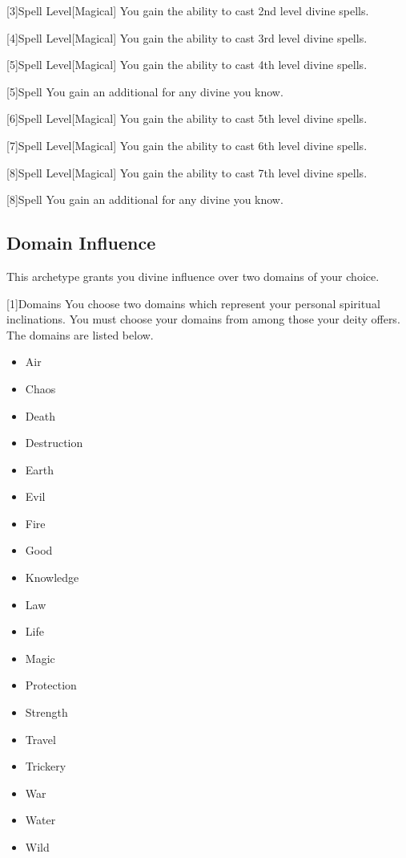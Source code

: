         [3]{Spell Level}[Magical] You gain the ability to cast 2nd level divine spells.

        [4]{Spell Level}[Magical] You gain the ability to cast 3rd level divine spells.

        [5]{Spell Level}[Magical] You gain the ability to cast 4th level divine spells.

        [5]{Spell} You gain an additional  for any divine  you know.

        [6]{Spell Level}[Magical] You gain the ability to cast 5th level divine spells.

        [7]{Spell Level}[Magical] You gain the ability to cast 6th level divine spells.

        [8]{Spell Level}[Magical] You gain the ability to cast 7th level divine spells.

        [8]{Spell} You gain an additional  for any divine  you know.

    \subsection{Domain Influence}
        This archetype grants you divine influence over two domains of your choice.

        [1]{Domains}
        You choose two domains which represent your personal spiritual inclinations.
        You must choose your domains from among those your deity offers.
        The domains are listed below.

        \begin{itemize}
            \item{Air}
            \item{Chaos}
            \item{Death}
            \item{Destruction}
            \item{Earth}
            \item{Evil}
            \item{Fire}
            \item{Good}
            \item{Knowledge}
            \item{Law}
            \item{Life}
            \item{Magic}
            \item{Protection}
            \item{Strength}
            \item{Travel}
            \item{Trickery}
            \item{War}
            \item{Water}
            \item{Wild}
        \end{itemize}

